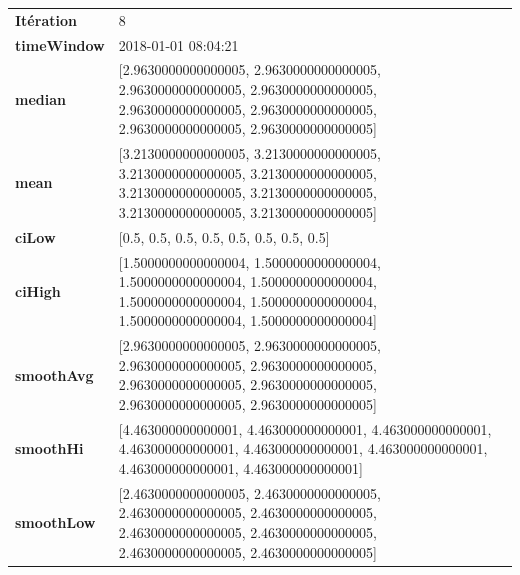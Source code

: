 \begin{table}[H]
	\centering
	\begin{tabularx}{\textwidth}{lX}
		\textbf{Itération}& 8 \\
		\textbf{timeWindow}	 &  2018-01-01 08:04:21    \\
		\textbf{median} &[2.9630000000000005, 2.9630000000000005, 2.9630000000000005, 2.9630000000000005, 2.9630000000000005, 2.9630000000000005, 2.9630000000000005, 2.9630000000000005] 
		\\ 
		\textbf{mean} &  [3.2130000000000005, 3.2130000000000005, 3.2130000000000005, 3.2130000000000005, 3.2130000000000005, 3.2130000000000005, 3.2130000000000005, 3.2130000000000005] 
		\\
		\textbf{ciLow} & [0.5, 0.5, 0.5, 0.5, 0.5, 0.5, 0.5, 0.5] \\
		\textbf{ciHigh}& [1.5000000000000004, 1.5000000000000004, 1.5000000000000004, 1.5000000000000004, 1.5000000000000004, 1.5000000000000004, 1.5000000000000004, 1.5000000000000004] 
		\\
		\textbf{smoothAvg} & [2.9630000000000005, 2.9630000000000005, 2.9630000000000005, 2.9630000000000005, 2.9630000000000005, 2.9630000000000005, 2.9630000000000005, 2.9630000000000005] 
		\\
		\textbf{smoothHi} & [4.463000000000001, 4.463000000000001, 4.463000000000001, 4.463000000000001, 4.463000000000001, 4.463000000000001, 4.463000000000001, 4.463000000000001] 
		\\
		\textbf{smoothLow} & [2.4630000000000005, 2.4630000000000005, 2.4630000000000005, 2.4630000000000005, 2.4630000000000005, 2.4630000000000005, 2.4630000000000005, 2.4630000000000005]
		\\ 
	\end{tabularx} 
\end{table}


